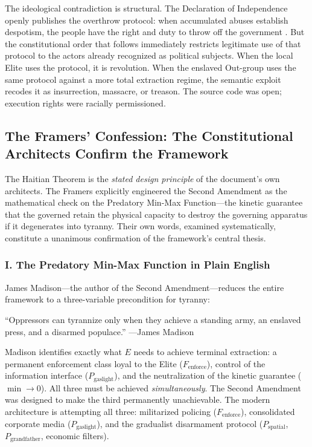 The ideological contradiction is structural. The Declaration of Independence openly publishes the overthrow protocol: when accumulated abuses establish despotism, the people have the right and duty to throw off the government \cite{declaration_independence_1776}. But the constitutional order that follows immediately restricts legitimate use of that protocol to the actors already recognized as political subjects. When the local Elite uses the protocol, it is revolution. When the enslaved Out-group uses the same protocol against a more total extraction regime, the semantic exploit recodes it as insurrection, massacre, or treason. The source code was open; execution rights were racially permissioned.

\subsection{The Framers' Confession: The Constitutional Architects Confirm the Framework}

The Haitian Theorem is the \textit{stated design principle} of the document's own architects. The Framers explicitly engineered the Second Amendment as the mathematical check on the Predatory Min-Max Function---the kinetic guarantee that the governed retain the physical capacity to destroy the governing apparatus if it degenerates into tyranny. Their own words, examined systematically, constitute a unanimous confirmation of the framework's central thesis.

\subsubsection*{I. The Predatory Min-Max Function in Plain English}

James Madison---the author of the Second Amendment---reduces the entire framework to a three-variable precondition for tyranny:

\begin{historicalsource}
``Oppressors can tyrannize only when they achieve a standing army, an enslaved press, and a disarmed populace.'' \hfill ---James Madison
\end{historicalsource}

Madison identifies exactly what $E$ needs to achieve terminal extraction: a permanent enforcement class loyal to the Elite ($F_{\text{enforce}}$), control of the information interface ($P_{\text{gaslight}}$), and the neutralization of the kinetic guarantee ($\min \rightarrow 0$). All three must be achieved \textit{simultaneously}. The Second Amendment was designed to make the third permanently unachievable. The modern architecture is attempting all three: militarized policing ($F_{\text{enforce}}$), consolidated corporate media ($P_{\text{gaslight}}$), and the gradualist disarmament protocol ($P_{\text{spatial}}$, $P_{\text{grandfather}}$, economic filters).


